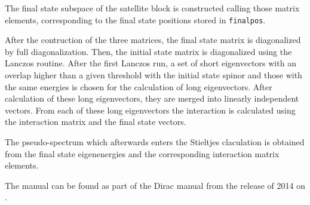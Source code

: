 The final state subspace of the satellite block is constructed calling
those matrix elements, corresponding to the final state positions stored
in \verb|finalpos|.

After the contruction of the three matrices, the final state matrix is
diagonalized by full diagonalization. Then, the initial state matrix
is diagonalized using the Lanczos routine. After the first Lanczos run,
a set of short eigenvectors with an overlap higher than a given threshold
with the initial state spinor and those with the same energies
is chosen for the calculation of long eigenvectors.
After calculation of these long eigenvectors, they are merged into linearly
independent vectors. From each of these long eigenvectors the interaction
is calculated using the interaction matrix and the final state vectors.

The pseudo-spectrum which afterwards enters the Stieltjes claculation
is obtained from the final state eigenenergies and the corresponding interaction
matrix elements.

The manual can be found as part of the Dirac manual from the release of 2014
on \cite{DIRAC13}.


